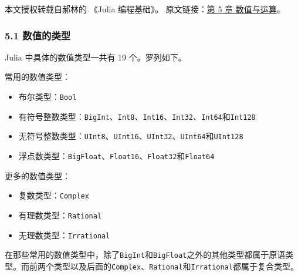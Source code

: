 
本文授权转载自郝林的 《Julia 编程基础》。 原文链接：\href{https://github.com/hyper0x/JuliaBasics/blob/master/book/ch05.md}{第 5 章 数值与运算}。


\subsubsection{5.1 数值的类型}

Julia 中具体的数值类型一共有 19 个。罗列如下。

常用的数值类型：

\begin{itemize}
\item 布尔类型：\verb|Bool|
\item  有符号整数类型：\verb|BigInt|、\verb|Int8|、\verb|Int16|、\verb|Int32|、\verb|Int64|和\verb|Int128|
\item  无符号整数类型：\verb|UInt8|、\verb|UInt16|、\verb|UInt32|、\verb|UInt64|和\verb|UInt128|
\item  浮点数类型：\verb|BigFloat|、\verb|Float16|、\verb|Float32|和\verb|Float64|
\end{itemize}

更多的数值类型：

\begin{itemize}
\item 复数类型：\verb|Complex|
\item 有理数类型：\verb|Rational|
\item 无理数类型：\verb|Irrational|
\end{itemize}

在那些常用的数值类型中，除了\verb|BigInt|和\verb|BigFloat|之外的其他类型都属于原语类型。而前两个类型以及后面的\verb|Complex|、\verb|Rational|和\verb|Irrational|都属于复合类型。